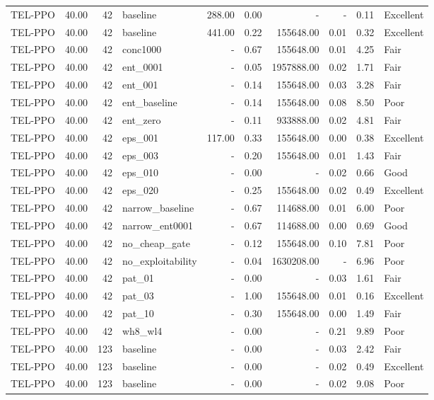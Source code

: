 \begin{table}[htbp]
\begin{tabular}{lrrlrrrrrl}
TEL-PPO & 40.00 & 42 & baseline & 288.00 & 0.00 & - & - & 0.11 & Excellent \\
TEL-PPO & 40.00 & 42 & baseline & 441.00 & 0.22 & 155648.00 & 0.01 & 0.32 & Excellent \\
TEL-PPO & 40.00 & 42 & conc1000 & - & 0.67 & 155648.00 & 0.01 & 4.25 & Fair \\
TEL-PPO & 40.00 & 42 & ent_0001 & - & 0.05 & 1957888.00 & 0.02 & 1.71 & Fair \\
TEL-PPO & 40.00 & 42 & ent_001 & - & 0.14 & 155648.00 & 0.03 & 3.28 & Fair \\
TEL-PPO & 40.00 & 42 & ent_baseline & - & 0.14 & 155648.00 & 0.08 & 8.50 & Poor \\
TEL-PPO & 40.00 & 42 & ent_zero & - & 0.11 & 933888.00 & 0.02 & 4.81 & Fair \\
TEL-PPO & 40.00 & 42 & eps_001 & 117.00 & 0.33 & 155648.00 & 0.00 & 0.38 & Excellent \\
TEL-PPO & 40.00 & 42 & eps_003 & - & 0.20 & 155648.00 & 0.01 & 1.43 & Fair \\
TEL-PPO & 40.00 & 42 & eps_010 & - & 0.00 & - & 0.02 & 0.66 & Good \\
TEL-PPO & 40.00 & 42 & eps_020 & - & 0.25 & 155648.00 & 0.02 & 0.49 & Excellent \\
TEL-PPO & 40.00 & 42 & narrow_baseline & - & 0.67 & 114688.00 & 0.01 & 6.00 & Poor \\
TEL-PPO & 40.00 & 42 & narrow_ent0001 & - & 0.67 & 114688.00 & 0.00 & 0.69 & Good \\
TEL-PPO & 40.00 & 42 & no_cheap_gate & - & 0.12 & 155648.00 & 0.10 & 7.81 & Poor \\
TEL-PPO & 40.00 & 42 & no_exploitability & - & 0.04 & 1630208.00 & - & 6.96 & Poor \\
TEL-PPO & 40.00 & 42 & pat_01 & - & 0.00 & - & 0.03 & 1.61 & Fair \\
TEL-PPO & 40.00 & 42 & pat_03 & - & 1.00 & 155648.00 & 0.01 & 0.16 & Excellent \\
TEL-PPO & 40.00 & 42 & pat_10 & - & 0.30 & 155648.00 & 0.00 & 1.49 & Fair \\
TEL-PPO & 40.00 & 42 & wh8_wl4 & - & 0.00 & - & 0.21 & 9.89 & Poor \\
TEL-PPO & 40.00 & 123 & baseline & - & 0.00 & - & 0.03 & 2.42 & Fair \\
TEL-PPO & 40.00 & 123 & baseline & - & 0.00 & - & 0.02 & 0.49 & Excellent \\
TEL-PPO & 40.00 & 123 & baseline & - & 0.00 & - & 0.02 & 9.08 & Poor \\

\end{tabular}
\end{table}
